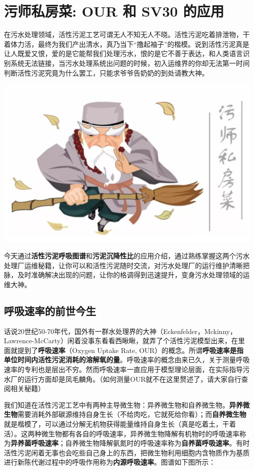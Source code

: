 \documentclass[]{book}
\begin{document}
\section{污师私房菜: OUR 和 SV30 的应用}\label{-our--sv30-}

在污水处理领域，活性污泥工艺可谓无人不知无人不晓。活性污泥吃着排泄物，干着体力活，最终为我们产出清水，真乃当下``撸起袖子''的楷模。说到活性污泥真是让人既爱又恨，爱的是它能帮我们处理污水，恨的是它不善于表达，和人类语言识别系统无法链接，当污水处理系统出问题的时候，初入运维界的你却无法第一时间判断活性污泥究竟为什么罢工，只能求爷爷告奶奶的到处请教大神。

\includegraphics[width=6.67in]{images/os1}

今天通过\textbf{活性污泥呼吸图谱}和\textbf{污泥沉降性比}的应用介绍，通过熟练掌握这两个污水处理厂运维秘籍，让你可以和活性污泥随时交流，对污水处理厂的运行维护清晰把脉，及时准确解决出现的问题，让你的格调得到迅速提升，变身污水处理领域的运维大神。

\subsection{呼吸速率的前世今生}

话说20世纪50-70年代，国外有一群水处理界的大神（Eckenfelder，Mckinny，Lawrence-McCarty）闲着没事东看看西瞅瞅，就弄了个活性污泥模型出来，在里面就提到了\textbf{呼吸速率}（Oxygen
Uptake Rate,
OUR）的概念。所谓\textbf{呼吸速率是指单位时间内活性污泥消耗的溶解氧的量}。呼吸速率的概念由来已久，关于测量呼吸速率的专利也是层出不穷。然而呼吸速率一直应用于模型理论层面，在实际指导污水厂的运行方面却是凤毛麟角。（如何测量OUR就不在这里赘述了，请大家自行查阅相关秘籍）

我们知道在活性污泥工艺中有两种主导微生物：异养微生物和自养微生物。\textbf{异养微生物}需要消耗外部碳源维持自身生长（不给肉吃，它就死给你看）；而\textbf{自养微生物}就是楷模了，可以通过分解无机物获得能量维持自身生长（真是吃着土，干着活）。这两种微生物都有各自的呼吸速率，异养微生物降解有机物时的呼吸速率称为\textbf{异养菌呼吸速率}；自养微生物降解氨氮时的呼吸速率称为\textbf{自养菌呼吸速率}。有时活性污泥闲着无事也会吃些自己身上的东西，把微生物利用细胞内含物质作为基质进行新陈代谢过程中的呼吸作用称为\textbf{内源呼吸速率}。图谱如下图所示：
\end{document}
